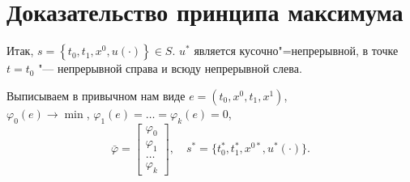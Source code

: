 \documentclass[12pt, a4paper]{article}
\theoremstyle{rusdef}
\DeclareMathOperator*{\thus}{\Rightarrow} %
\begin{document}







\section{Доказательство принципа максимума}

Итак, $s = \left\{ t_0, t_1, x^0, u(\cdot) \right\} \in S$. $u^*$ является кусочно"=непрерывной, в точке $t = t_0$ "--- непрерывной справа и всюду непрерывной слева.

Выписываем в привычном нам виде $e = (t_0, x^0, t_1, x^1)$, \\ $\varphi_0(e) \to \min$, $\varphi_1(e) = \ldots = \varphi_k(e) = 0$,
\[
  \bar{\varphi} =
  \begin{bmatrix}
    \varphi_0 \\ \varphi_1 \\ \ldots \\ \varphi_k
  \end{bmatrix},
  \quad
  s^* = \{ t_0^*, t_1^*, x^{0*}, u^*(\cdot) \}.
\]
\end{document}
